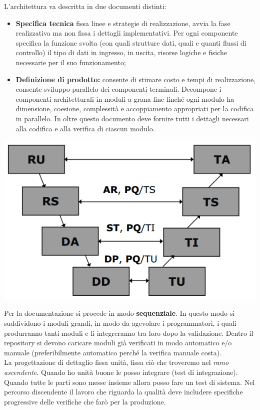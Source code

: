 L'architettura va descritta in due documenti distinti:

\begin{itemize}

	\item \textbf{Specifica tecnica} fissa linee e strategie di realizzazione, avvia la fase realizzativa ma non fissa i dettagli implementativi. Per ogni componente specifica la funzione svolta (con quali strutture dati, quali e quanti flussi di controllo) il tipo di dati in ingresso, in uscita, risorse logiche e fisiche necessarie per il suo funzionamento;
	\item \textbf{Definizione di prodotto:} consente di stimare costo e tempi di realizzazione,  consente sviluppo parallelo dei componenti terminali. Decompone i componenti architetturali in moduli a grana fine finché ogni modulo ha dimensione, coesione, complessità e accoppiamento appropriati per la codifica in parallelo. In oltre questo documento deve fornire tutti i dettagli necessari alla codifica e alla verifica di ciascun modulo.

\end{itemize}

\begin{center}
\includegraphics[width=0.4\columnwidth]{img1}
\end{center}

Per la documentazione si procede in modo \textbf{sequenziale}. In questo modo si suddividono i moduli grandi, in modo da agevolare i programmatori, i quali produrranno tanti moduli e li integreranno tra loro dopo la validazione. Dentro il repository si devono caricare moduli già verificati in modo automatico e/o manuale (preferibilmente automatico perché la verifica manuale costa).\\
La progettazione di dettaglio fissa unità, fissa ciò che troveremo nel \textit{ramo ascendente}. Quando ho unità buone le posso integrare (test di integrazione). Quando tutte le parti sono messe insieme allora posso fare un test di sistema. Nel percorso discendente il lavoro che riguarda la qualità deve includere specifiche progressive delle verifiche che farò per la produzione.\\

